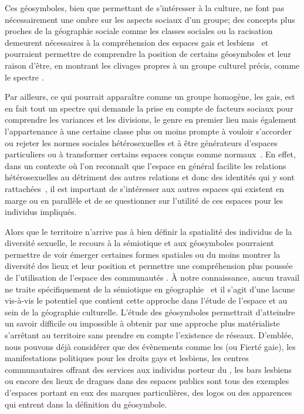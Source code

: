 Ces géosymboles, bien que permettant de s'intéresser à la culture, ne font pas nécessairement une ombre sur les aspects sociaux d'un groupe; des concepts plus proches de la géographie sociale comme les classes sociales ou la racisation~\citep{Bonniol2005} demeurent nécessaires à la compréhension des espaces gais et lesbiens~\citep[93]{Oswin2008} et pourraient permettre de comprendre la position de certains géosymboles et leur raison d'être, en montrant les clivages propres à un groupe culturel précis, comme le spectre \lgbt{}.

Par ailleurs, ce qui pourrait apparaître comme un groupe homogène, les gais, est en fait tout un spectre qui demande la prise en compte de facteurs sociaux pour comprendre les variances et les divisions, le genre en premier lieu mais également l'appartenance à une certaine classe plus ou moins prompte à vouloir s'accorder ou rejeter les normes sociales hétérosexuelles et à être générateurs d'espaces particuliers ou à transformer certains espaces conçus comme normaux~\citep{Lewis2011}. 
En effet, dans un contexte où l'on reconnaît que l'espace en général facilite les relations hétérosexuelles au détriment des autres relations et donc des identités qui y sont rattachées~\citep{Brown2003}, il est important de s'intéresser aux autres espaces qui existent en marge ou en parallèle et de se questionner sur l'utilité de ces espaces pour les individus impliqués.

Alors que le territoire n'arrive pas à bien définir la spatialité des individus de la diversité sexuelle, le recours à la sémiotique et aux géosymboles pourraient permettre de voir émerger certaines formes spatiales ou du moins montrer la diversité des lieux et leur position et permettre une compréhension plus poussée de l'utilisation de l'espace des communautés \lgbt{}. 
À notre connaissance, aucun travail ne traite spécifiquement de la sémiotique en géographie \qu\ et il s'agit d'une lacune vis-à-vis le potentiel que contient cette approche dans l'étude de l'espace et au sein de la géographie culturelle.
L'étude des géosymboles permettrait d'atteindre un savoir difficile ou impossible à obtenir par une approche plus matérialiste s'arrêtant au territoire sans prendre en compte l'existence de réseaux. 
D'emblée, nous pouvons déjà considérer que des évènements comme les  (ou Fierté gaie), les manifestations politiques pour les droits gays et lesbiens, les centres communautaires offrant des services aux individus porteur du \vih, les bars lesbiens ou encore des lieux de dragues dans des espaces publics sont tous des exemples d'espaces \lgbt{} portant en eux des marques particulières, des logos ou des apparences qui entrent dans la définition du géosymbole.

